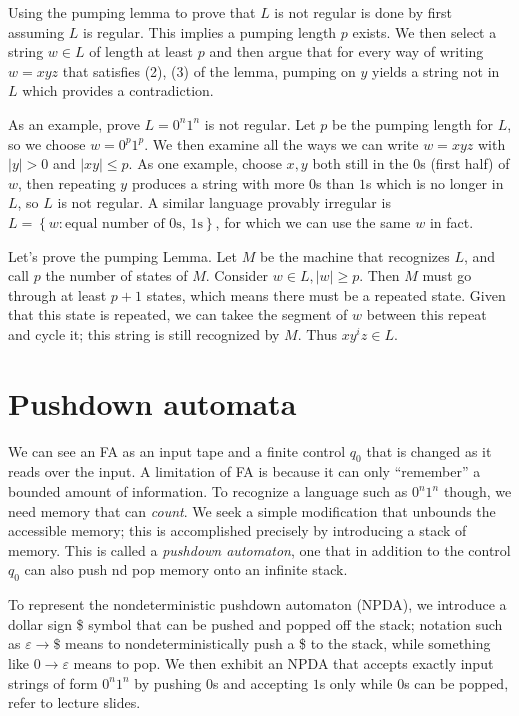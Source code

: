 \documentclass[10pt]{report}
\newcommand{\abs}[1]{\left|#1\right|}
\begin{document}
Using the pumping lemma to prove that $L$ is not regular is done by first assuming $L$ is regular. This implies a pumping length $p$ exists. We then select a string $w \in L$ of length at least $p$ and then argue that for every way of writing $w=xyz$ that satisfies (2), (3) of the lemma, pumping on $y$ yields a string not in $L$ which provides a contradiction.

As an example, prove $L = 0^n1^n$ is not regular. Let $p$ be the pumping length for $L$, so we choose $w = 0^p 1^p$. We then examine all the ways we can write $w = xyz$ with $\abs{y}> 0$ and $\abs{xy}\leq p$. As one example, choose $x,y$ both still in the $0$s (first half) of $w$, then repeating $y$ produces a string with more $0$s than $1$s which is no longer in $L$, so $L$ is not regular. A similar language provably irregular is $L = \left\{ w: \text{equal number of $0$s, $1$s} \right\}$, for which we can use the same $w$ in fact. 

Let's prove the pumping Lemma. Let $M$ be the machine that recognizes $L$, and call $p$ the number of states of $M$. Consider $w \in L, \abs{w} \geq p$. Then $M$ must go through at least $p+1$ states, which means there must be a repeated state. Given that this state is repeated, we can takee the segment of $w$ between this repeat and cycle it; this string is still recognized by $M$. Thus $xy^iz \in L$. 

\section{Pushdown automata}

We can see an FA as an input tape and a finite control $q_0$ that is changed as it reads over the input. A limitation of FA is because it can only ``remember'' a bounded amount of information. To recognize a language such as $0^n1^n$ though, we need memory that can \emph{count}. We seek a simple modification that unbounds the accessible memory; this is accomplished precisely by introducing a stack of memory. This is called a \emph{pushdown automaton}, one that in addition to the control $q_0$ can also push nd pop memory onto an infinite stack.

To represent the nondeterministic pushdown automaton (NPDA), we introduce a dollar sign \$ symbol that can be pushed and popped off the stack; notation such as $\varepsilon \to \$$ means to nondeterministically push a \$ to the stack, while something like $0 \to \varepsilon$ means to pop. We then exhibit an NPDA that accepts exactly input strings of form $0^n1^n$ by pushing $0$s and accepting $1$s only while $0$s can be popped, refer to lecture slides.
\end{document}
